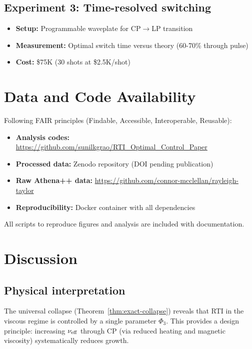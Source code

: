 \documentclass[aps,pre,twocolumn,showpacs,superscriptaddress]{revtex4-2}
\theoremstyle{definition}
\begin{document}
\subsection{Experiment 3: Time-resolved switching}
\begin{itemize}
\item \textbf{Setup:} Programmable waveplate for CP$\to$LP transition
\item \textbf{Measurement:} Optimal switch time versus theory (60-70\% through pulse)
\item \textbf{Cost:} \$75K (30 shots at \$2.5K/shot)
\end{itemize}

\section{Data and Code Availability}\label{sec:data}

Following FAIR principles (Findable, Accessible, Interoperable, Reusable):

\begin{itemize}
\item \textbf{Analysis codes:} \url{https://github.com/sunilkgrao/RTI_Optimal_Control_Paper}
\item \textbf{Processed data:} Zenodo repository (DOI pending publication)
\item \textbf{Raw Athena++ data:} \url{https://github.com/connor-mcclellan/rayleigh-taylor}
\item \textbf{Reproducibility:} Docker container with all dependencies
\end{itemize}

All scripts to reproduce figures and analysis are included with documentation.

\section{Discussion}\label{sec:discussion}

\subsection{Physical interpretation}

The universal collapse (Theorem~\ref{thm:exact-collapse}) reveals that RTI in the viscous regime is controlled by a single parameter $\Phi_3$. This provides a design principle: increasing $\nu_{\rm eff}$ through CP (via reduced heating and magnetic viscosity) systematically reduces growth.
\end{document}

